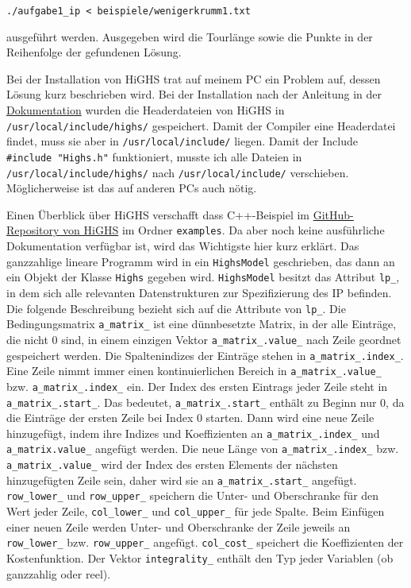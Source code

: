 \documentclass[a4paper, 10pt, ngerman]{article}
\begin{document}
\medskip
\verb|./aufgabe1_ip < beispiele/wenigerkrumm1.txt|
\medskip

\noindent ausgeführt werden. Ausgegeben wird die Tourlänge sowie die Punkte in der Reihenfolge der gefundenen Lösung.

Bei der Installation von HiGHS trat auf meinem PC ein Problem auf, dessen Lösung kurz beschrieben wird. Bei der Installation nach der Anleitung in der \href{https://ergo-code.github.io/HiGHS/dev/}{Dokumentation} wurden die Headerdateien von HiGHS in \verb|/usr/local/include/highs/| gespeichert. Damit der Compiler eine Headerdatei findet, muss sie aber in \verb|/usr/local/include/| liegen. Damit der Include \verb|#include "Highs.h"| funktioniert, musste ich alle Dateien in \verb|/usr/local/include/highs/| nach \verb|/usr/local/include/| verschieben. Möglicherweise ist das auf anderen PCs auch nötig.

Einen Überblick über HiGHS verschafft dass C++-Beispiel im \href{https://github.com/ERGO-Code/HiGHS}{GitHub-Repository von HiGHS} im Ordner \verb|examples|. Da aber noch keine ausführliche Dokumentation verfügbar ist, wird das Wichtigste hier kurz erklärt. Das ganzzahlige lineare Programm wird in ein \verb|HighsModel| geschrieben, das dann an ein Objekt der Klasse \verb|Highs| gegeben wird. \verb|HighsModel| besitzt das Attribut \verb|lp_|, in dem sich alle relevanten Datenstrukturen zur Spezifizierung des IP befinden. Die folgende Beschreibung bezieht sich auf die Attribute von \verb|lp_|. Die Bedingungsmatrix \verb|a_matrix_| ist eine dünnbesetzte Matrix, in der alle Einträge, die nicht 0 sind, in einem einzigen Vektor \verb|a_matrix_.value_| nach Zeile geordnet gespeichert werden. Die Spaltenindizes der Einträge stehen in \verb|a_matrix_.index_|. Eine Zeile nimmt immer einen kontinuierlichen Bereich in \verb|a_matrix_.value_| bzw. \verb|a_matrix_.index_| ein. Der Index des ersten Eintrags jeder Zeile steht in \verb|a_matrix_.start_|. Das bedeutet, \verb|a_matrix_.start_| enthält zu Beginn nur 0, da die Einträge der ersten Zeile bei Index 0 starten. Dann wird eine neue Zeile hinzugefügt, indem ihre Indizes und Koeffizienten an \verb|a_matrix_.index_| und \verb|a_matrix.value_| angefügt werden. Die neue Länge von \verb|a_matrix_.index_| bzw. \verb|a_matrix_.value_| wird der Index des ersten Elements der nächsten hinzugefügten Zeile sein, daher wird sie an \verb|a_matrix_.start_| angefügt. \verb|row_lower_| und \verb|row_upper_| speichern die Unter- und Oberschranke für den Wert jeder Zeile, \verb|col_lower_| und \verb|col_upper_| für jede Spalte. Beim Einfügen einer neuen Zeile werden Unter- und Oberschranke der Zeile jeweils an \verb|row_lower_| bzw. \verb|row_upper_| angefügt. \verb|col_cost_| speichert die Koeffizienten der Kostenfunktion. Der Vektor \verb|integrality_| enthält den Typ jeder Variablen (ob ganzzahlig oder reel).
\end{document}
